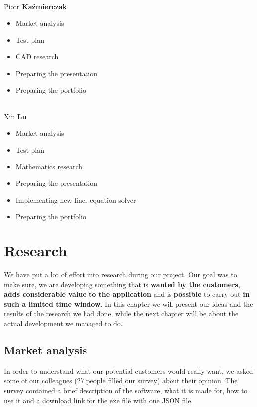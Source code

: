\documentclass[a4paper, 11pt, article]{report}
\begin{document}
\noindent \\ Piotr \textbf{Kaźmierczak} 
\begin{itemize}
	\item Market analysis
	\item Test plan
	\item CAD research
	\item Preparing the presentation
	\item Preparing the portfolio
\end{itemize}

\noindent \\ Xin \textbf{Lu}
\begin{itemize}
	\item Market analysis
	\item Test plan
	\item Mathematics research
	\item Preparing the presentation
	\item Implementing new liner equation solver
	\item Preparing the portfolio
\end{itemize}


\chapter{Research}

We have put a lot of effort into research during our project. Our goal was to make sure, we are developing something that is \textbf{wanted by the customers}, \textbf{adds considerable value to the application} and is \textbf{possible} to carry out \textbf{in such a limited time window}. In this chapter we will present our ideas and the results of the research we had done, while the next chapter will be about the actual development we managed to do.

\section{Market analysis}

In order to understand what our potential customers would really want, we asked some of our colleagues (27 people filled our survey) about their opinion. The survey contained a brief description of the software, what it is made for, how to use it and a download link for the exe file with one JSON file.
\end{document}
